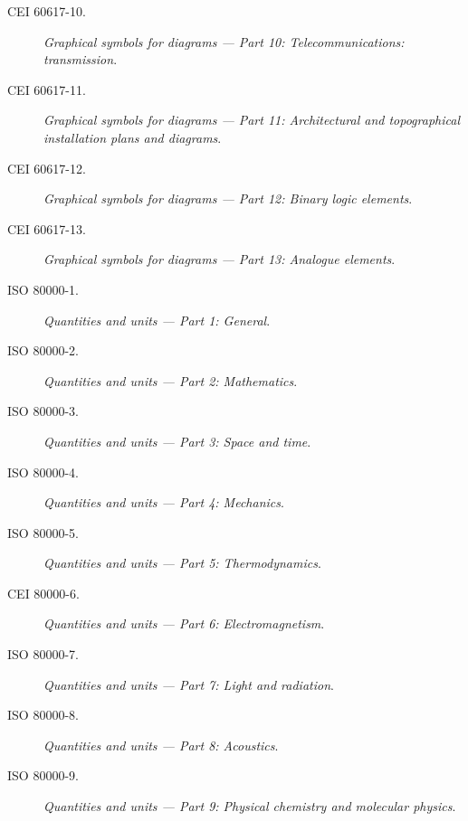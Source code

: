 \begin{description}
    \item [\hspace{5mm}CEI 60617-10.] \textit{Graphical symbols for diagrams --- Part 10: Telecommunications: transmission}.
    \item [\hspace{5mm}CEI 60617-11.] \textit{Graphical symbols for diagrams --- Part 11: Architectural and topographical installation plans and diagrams}.
    \item [\hspace{5mm}CEI 60617-12.] \textit{Graphical symbols for diagrams --- Part 12: Binary logic elements}.
    \item [\hspace{5mm}CEI 60617-13.] \textit{Graphical symbols for diagrams --- Part 13: Analogue elements}.
    \item [\hspace{5mm}ISO 80000-1.] \textit{Quantities and units --- Part 1: General}.
    \item [\hspace{5mm}ISO 80000-2.] \textit{Quantities and units --- Part 2: Mathematics}.
    \item [\hspace{5mm}ISO 80000-3.] \textit{Quantities and units --- Part 3: Space and time}. 
    \item [\hspace{5mm}ISO 80000-4.] \textit{Quantities and units --- Part 4: Mechanics}.
    \item [\hspace{5mm}ISO 80000-5.] \textit{Quantities and units --- Part 5: Thermodynamics}.
    \item [\hspace{5mm}CEI 80000-6.] \textit{Quantities and units --- Part 6: Electromagnetism}.
    \item [\hspace{5mm}ISO 80000-7.] \textit{Quantities and units --- Part 7: Light and radiation}.
    \item [\hspace{5mm}ISO 80000-8.] \textit{Quantities and units --- Part 8: Acoustics}.
	\item [\hspace{5mm}ISO 80000-9.] \textit{Quantities and units --- Part 9: Physical chemistry and molecular physics}.

\end{description}
